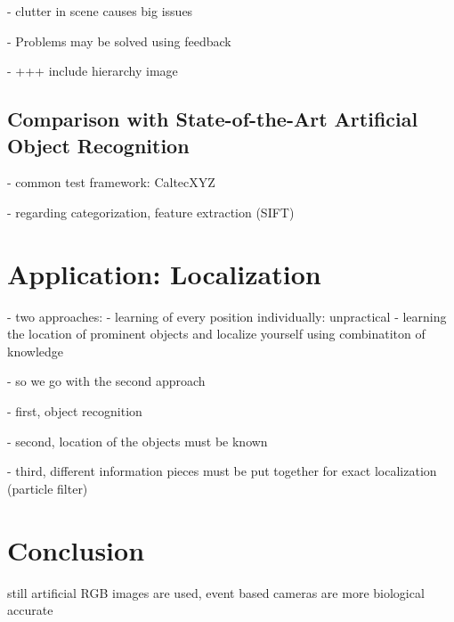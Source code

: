 		- clutter in scene causes big issues
		
		- Problems may be solved using feedback

		- +++ include hierarchy image
	
	\section{Comparison with State-of-the-Art Artificial Object Recognition}
	
		- common test framework: CaltecXYZ
	
		- regarding categorization, feature extraction (SIFT)
		
		\citep{serre2007robust}
			
\chapter{Application: Localization}

	- two approaches:
		- learning of every position individually: unpractical
		- learning the location of prominent objects and localize yourself using combinatiton of knowledge

	- so we go with the second approach

	- first, object recognition
	
	- second, location of the objects must be known
	
	- third, different information pieces must be put together for exact localization (particle filter) \citep{siagian2009biologically}


\chapter{Conclusion}

	still artificial RGB images are used, event based cameras are more biological accurate
	

